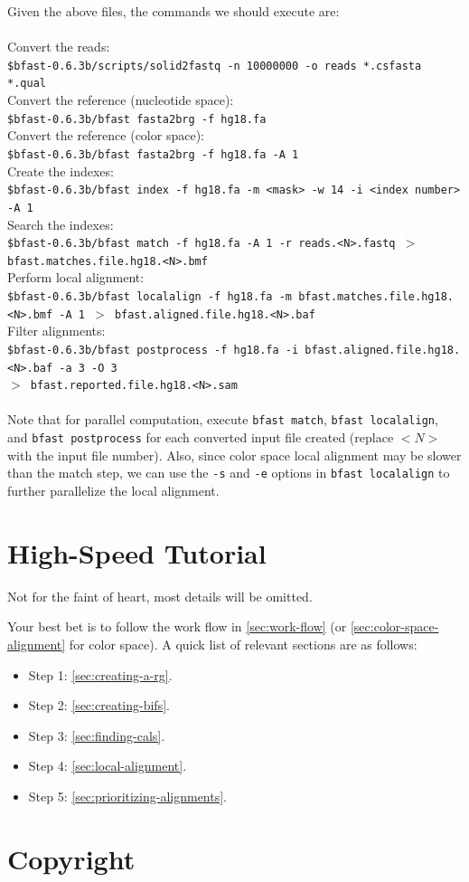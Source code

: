 \documentclass[a4paper,12pt]{book}
\newcommand{\Version}{0.6.3b}
\newcommand{\TT}[1]{{\tt #1}} %
\begin{document}
Given the above files, the commands we should execute are:
\\\\
Convert the reads:\\
{\tt \scriptsize \$bfast-\Version{}/scripts/solid2fastq -n 10000000 -o reads *.csfasta *.qual\\}
Convert the reference (nucleotide space):\\
{\tt \scriptsize \$bfast-\Version{}/bfast fasta2brg -f hg18.fa\\}
Convert the reference (color space):\\
{\tt \scriptsize \$bfast-\Version{}/bfast fasta2brg -f hg18.fa -A 1 \\}
Create the indexes:\\
{\tt \scriptsize \$bfast-\Version{}/bfast index -f hg18.fa -m <mask> -w 14 -i <index number> -A 1\\}
Search the indexes:\\
{\tt \scriptsize \$bfast-\Version{}/bfast match -f hg18.fa -A 1 -r reads.<N>.fastq $>$ bfast.matches.file.hg18.<N>.bmf\\}
Perform local alignment:\\
{\tt \scriptsize \$bfast-\Version{}/bfast localalign -f hg18.fa -m bfast.matches.file.hg18.<N>.bmf -A 1 $>$ bfast.aligned.file.hg18.<N>.baf\\}
Filter alignments:\\
{\tt \scriptsize \$bfast-\Version{}/bfast postprocess -f hg18.fa -i bfast.aligned.file.hg18.<N>.baf -a 3 -O 3\\
$>$ bfast.reported.file.hg18.<N>.sam\\}
\\
Note that for parallel computation, execute {\tt bfast match}, {\tt bfast localalign}, and {\tt bfast postprocess} for each converted input file created (replace $<N>$ with the input file number).
Also, since color space local alignment may be slower than the match step, we can use the \TT{-s} and \TT{-e} options in {\tt bfast localalign} to further parallelize the local alignment.

\section{High-Speed Tutorial}
\label{sec:high-speed-tutorial}
Not for the faint of heart, most details will be omitted.

Your best bet is to follow the work flow in \autoref{sec:work-flow} (or \autoref{sec:color-space-alignment} for color space).
A quick list of relevant sections are as follows:
\begin{itemize}
	\item Step 1: \autoref{sec:creating-a-rg}.
	\item Step 2: \autoref{sec:creating-bifs}.
	\item Step 3: \autoref{sec:finding-cals}.
	\item Step 4: \autoref{sec:local-alignment}.
	\item Step 5: \autoref{sec:prioritizing-alignments}.
\end{itemize}
\section{Copyright}


{}


\end{document}
